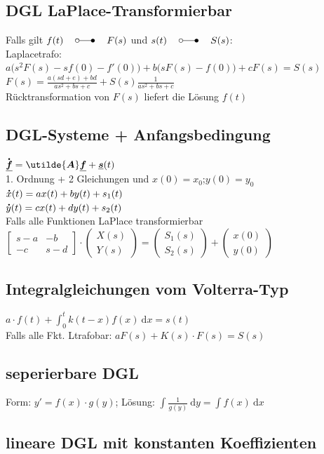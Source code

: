 \documentclass[6pt,a4paper]{scrartcl}
\newcommand{\mat}[1]{\ensuremath{\begin{bmatrix} #1 \end{bmatrix}}}				%
\newcommand{\ma}[1]{\ensuremath{\utilde{\boldsymbol {#1}}}}						%
\newcommand{\vect}[1]{\ensuremath{\begin{pmatrix} #1 \end{pmatrix}}}			%
\let\oldlaplace = \laplace
\renewcommand{\vec}[1]{\ensuremath{\underline{\boldsymbol {#1}}}}
\renewcommand*{\dot}[1]{\accentset{\mbox{\textrm{\large\bfseries .}} }{#1}}
\newcommand{\diff}{\ensuremath{\ \mathrm d}}									%
\renewcommand{\laplace}{\ \; \oldlaplace \ \;}
\begin{document}
\begin{multicols}{4}
\subsection{DGL LaPlace-Transformierbar}
Falls gilt $f(t) \laplace F(s)$ und $s(t) \laplace S(s)$: \\
Laplacetrafo: $a\bigl(s^2 F(s) - sf(0) - f'(0)\bigr) + b\bigl( s F(s) - f(0) \bigr) + c F(s) = S(s)$\\
$F(s) = \frac{a(sd + e) + bd}{as^2 + bs +c} + S(s) \frac{1}{as^2 + bs +c}$ \\
Rücktransformation von $F(s)$ liefert die Lösung $f(t)$
	
	
	\subsection{DGL-Systeme + Anfangsbedingung}
	$\dot{ \vec f } = \ma A \vec f + \vec s(t)$\\ 
	1. Ordnung + 2 Gleichungen und $x(0) = x_0$;$y(0) = y_0$ \\
	$\dot x(t) = a x(t) + b y(t) + s_1(t)$\\
	$\dot y(t) = c x(t) + d y(t) + s_2(t)$\\
	Falls alle Funktionen LaPlace transformierbar\\
	$\mat{ s-a & -b \\ -c & s-d} \cdot \vect{X(s) \\ Y(s)} = \vect{S_1(s) \\ S_2(s)} + \vect{x(0) \\ y(0)}$


	\subsection{Integralgleichungen vom Volterra-Typ}
	$a \cdot f(t) + \int_0^t k(t-x) f(x) \diff x = s(t)$\\
	Falls alle Fkt. Ltrafobar: $a F(s) + K(s) \cdot F(s) = S(s)$


	\subsection{seperierbare DGL}
	Form: $y' = f(x) \cdot g(y)$; Lösung: $\int \frac{1}{g(y)} \diff y = \int f(x) \diff x$



	\subsection{lineare DGL mit konstanten Koeffizienten}
	

\end{multicols}
\end{document}
